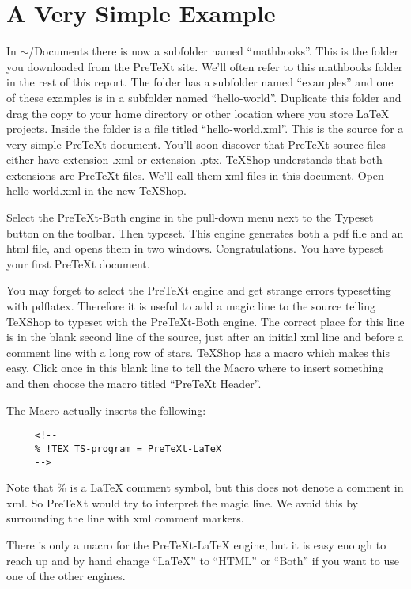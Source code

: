 \documentclass[11pt, oneside]{article}   	%
\begin{document}
 \section{A Very Simple Example}
 
 In $\sim$/Documents there is now a subfolder named ``mathbooks''. This is the folder you downloaded from the PreTeXt site. We'll often refer to this mathbooks folder in the rest of this report. The folder has a subfolder named ``examples''  and one of these examples is in a subfolder named ``hello-world''. Duplicate this folder and drag the copy to your home directory or other location where you store LaTeX projects.  Inside the folder is a file titled ``hello-world.xml''. This is the source for a very simple PreTeXt document. You'll soon discover that PreTeXt source files either have extension .xml or  extension .ptx. TeXShop understands that both extensions are PreTeXt files. We'll call them xml-files in this document. Open hello-world.xml in the new TeXShop.

Select the PreTeXt-Both engine in the pull-down menu next to the Typeset button on the toolbar. Then typeset. This engine generates both a pdf file and an html file, and opens them in two windows. Congratulations. You have typeset your first PreTeXt document.

You may forget to select the PreTeXt engine and get strange errors typesetting with pdflatex. Therefore it is useful to add a magic line to the source telling TeXShop to typeset with the PreTeXt-Both engine. The correct place for this line is in the blank second line of the source, just after an initial xml line and before a comment line with a long row of stars. TeXShop has a macro which makes this easy. Click once in this blank line to tell the Macro where to insert something and then choose the macro titled ``PreTeXt Header''. 

The Macro actually inserts the following:
\begin{verbatim}
     <!--
     % !TEX TS-program = PreTeXt-LaTeX
     -->
\end{verbatim}

Note that \% is a LaTeX comment symbol, but this does not denote a comment in xml.  So  PreTeXt would try to interpret the magic line. We avoid this by surrounding the line with xml comment markers. 

There is only a macro for the PreTeXt-LaTeX engine, but it is easy enough to reach up and by hand change ``LaTeX'' to ``HTML'' or ``Both'' if you want to use one of the other engines. 
\end{document}
